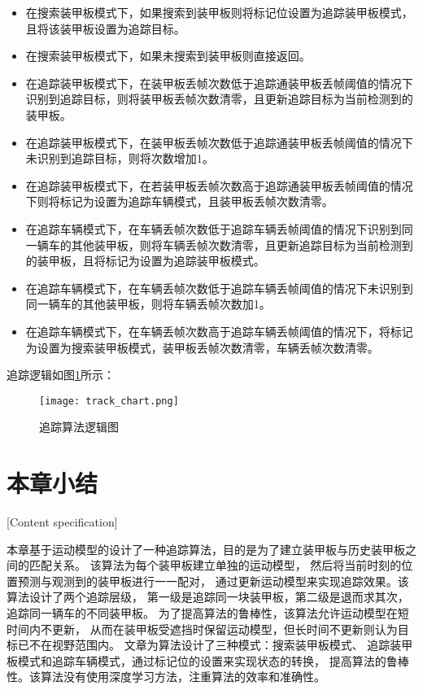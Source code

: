 \begin{itemize}[itemindent=2em]
\item 在搜索装甲板模式下，如果搜索到装甲板则将标记位设置为追踪装甲板模式，且将该装甲板设置为追踪目标。
\item 在搜索装甲板模式下，如果未搜索到装甲板则直接返回。
\item 在追踪装甲板模式下，在装甲板丢帧次数低于追踪通装甲板丢帧阈值的情况下识别到追踪目标，则将装甲板丢帧次数清零，且更新追踪目标为当前检测到的装甲板。
\item 在追踪装甲板模式下，在装甲板丢帧次数低于追踪通装甲板丢帧阈值的情况下未识别到追踪目标，则将次数增加1。
\item 在追踪装甲板模式下，在若装甲板丢帧次数高于追踪通装甲板丢帧阈值的情况下则将标记为设置为追踪车辆模式，且装甲板丢帧次数清零。
\item 在追踪车辆模式下，在车辆丢帧次数低于追踪车辆丢帧阈值的情况下识别到同一辆车的其他装甲板，则将车辆丢帧次数清零，且更新追踪目标为当前检测到的装甲板，且将标记为设置为追踪装甲板模式。
\item 在追踪车辆模式下，在车辆丢帧次数低于追踪车辆丢帧阈值的情况下未识别到同一辆车的其他装甲板，则将车辆丢帧次数加1。
\item 在追踪车辆模式下，在车辆丢帧次数高于追踪车辆丢帧阈值的情况下，将标记为设置为搜索装甲板模式，装甲板丢帧次数清零，车辆丢帧次数清零。
\end{itemize}

追踪逻辑如图\ref{追踪算法逻辑图}所示：

\begin{figure}[H]
    \centering
    \texttt{[image: track\_chart.png]} 
    \caption{追踪算法逻辑图} 
    \label{追踪算法逻辑图} 
\end{figure} 

\par


\section{本章小结}[Content specification]


本章基于运动模型的设计了一种追踪算法，目的是为了建立装甲板与历史装甲板之间的匹配关系。
该算法为每个装甲板建立单独的运动模型，
然后将当前时刻的位置预测与观测到的装甲板进行一一配对，
通过更新运动模型来实现追踪效果。该算法设计了两个追踪层级，
第一级是追踪同一块装甲板，第二级是退而求其次，追踪同一辆车的不同装甲板。
为了提高算法的鲁棒性，该算法允许运动模型在短时间内不更新，
从而在装甲板受遮挡时保留运动模型，但长时间不更新则认为目标已不在视野范围内。
文章为算法设计了三种模式：搜索装甲板模式、
追踪装甲板模式和追踪车辆模式，通过标记位的设置来实现状态的转换，
提高算法的鲁棒性。该算法没有使用深度学习方法，注重算法的效率和准确性。